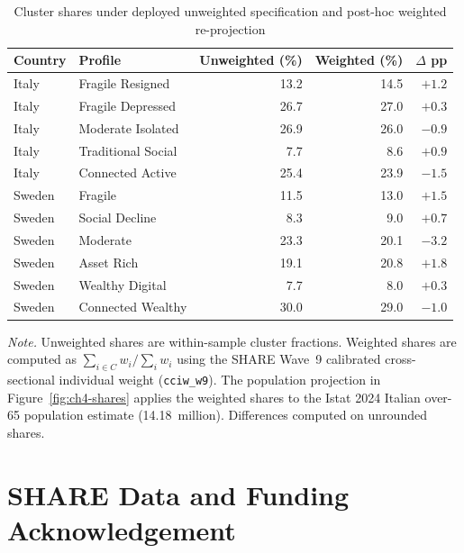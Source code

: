 \begin{table}[ht]
\centering
\caption[Unweighted vs weighted cluster shares]{Cluster shares under deployed unweighted specification and post-hoc weighted re-projection}
\label{tab:ch3-weighted-shares}
\small
\renewcommand{\arraystretch}{1.25}
\setlength{\tabcolsep}{10pt}
\begin{tabular}{llrrr}
\toprule
\textbf{Country} & \textbf{Profile} & \textbf{Unweighted (\%)} & \textbf{Weighted (\%)} & \textbf{$\Delta$ pp} \\
\midrule
Italy  & Fragile Resigned    & 13.2 & 14.5 & $+1.2$ \\
Italy  & Fragile Depressed   & 26.7 & 27.0 & $+0.3$ \\
Italy  & Moderate Isolated   & 26.9 & 26.0 & $-0.9$ \\
Italy  & Traditional Social  &  7.7 &  8.6 & $+0.9$ \\
Italy  & Connected Active    & 25.4 & 23.9 & $-1.5$ \\
\midrule
Sweden & Fragile             & 11.5 & 13.0 & $+1.5$ \\
Sweden & Social Decline      &  8.3 &  9.0 & $+0.7$ \\
Sweden & Moderate            & 23.3 & 20.1 & $-3.2$ \\
Sweden & Asset Rich          & 19.1 & 20.8 & $+1.8$ \\
Sweden & Wealthy Digital     &  7.7 &  8.0 & $+0.3$ \\
Sweden & Connected Wealthy   & 30.0 & 29.0 & $-1.0$ \\
\bottomrule
\end{tabular}
\par\medskip
\begin{minipage}{\linewidth}
\footnotesize\textit{Note.} Unweighted shares are within-sample cluster fractions. Weighted shares are computed as $\sum_{i \in C} w_i / \sum_i w_i$ using the SHARE Wave~9 calibrated cross-sectional individual weight (\texttt{cciw\_w9}). The population projection in Figure~\ref{fig:ch4-shares} applies the weighted shares to the Istat 2024 Italian over-65 population estimate (14.18~million). Differences computed on unrounded shares.
\end{minipage}
\end{table}


\chapter{SHARE Data and Funding Acknowledgement}
\label{ch:appx-share-funding}

